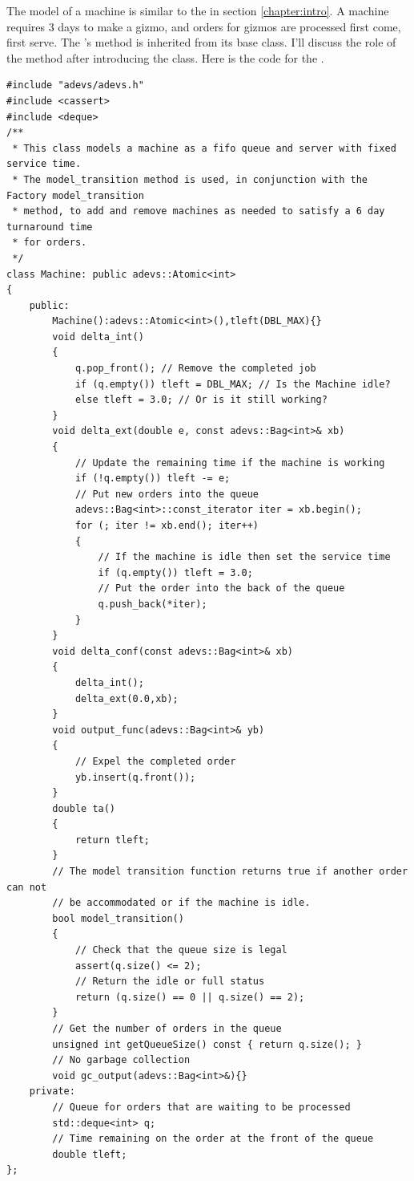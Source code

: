 The model of a machine is similar to the  in section \ref{chapter:intro}. A machine requires 3 days to make a gizmo, and orders for gizmos are processed first come, first serve. The 's  method is inherited from its  base class. I'll discuss the role of the  method after introducing the  class. Here is the code for the .
\begin{verbatim}
#include "adevs/adevs.h"
#include <cassert>
#include <deque>
/**
 * This class models a machine as a fifo queue and server with fixed service time.
 * The model_transition method is used, in conjunction with the Factory model_transition
 * method, to add and remove machines as needed to satisfy a 6 day turnaround time
 * for orders.
 */
class Machine: public adevs::Atomic<int>
{
    public:
        Machine():adevs::Atomic<int>(),tleft(DBL_MAX){}
        void delta_int()
        {
            q.pop_front(); // Remove the completed job
            if (q.empty()) tleft = DBL_MAX; // Is the Machine idle?
            else tleft = 3.0; // Or is it still working?
        }
        void delta_ext(double e, const adevs::Bag<int>& xb)
        {
            // Update the remaining time if the machine is working
            if (!q.empty()) tleft -= e;
            // Put new orders into the queue
            adevs::Bag<int>::const_iterator iter = xb.begin();
            for (; iter != xb.end(); iter++)
            {
                // If the machine is idle then set the service time
                if (q.empty()) tleft = 3.0;
                // Put the order into the back of the queue
                q.push_back(*iter);
            }
        }
        void delta_conf(const adevs::Bag<int>& xb)
        {
            delta_int();
            delta_ext(0.0,xb);
        }
        void output_func(adevs::Bag<int>& yb)
        {
            // Expel the completed order
            yb.insert(q.front());
        }
        double ta()
        {
            return tleft;
        }
        // The model transition function returns true if another order can not
        // be accommodated or if the machine is idle.
        bool model_transition()
        {
            // Check that the queue size is legal
            assert(q.size() <= 2);
            // Return the idle or full status
            return (q.size() == 0 || q.size() == 2);
        }
        // Get the number of orders in the queue
        unsigned int getQueueSize() const { return q.size(); }
        // No garbage collection
        void gc_output(adevs::Bag<int>&){}
    private:
        // Queue for orders that are waiting to be processed
        std::deque<int> q;
        // Time remaining on the order at the front of the queue
        double tleft;
};
\end{verbatim}

